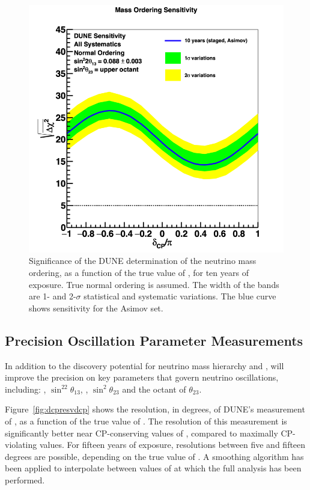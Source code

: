 \begin{figure}[h!]
    \centering
		\includegraphics[width=0.95\linewidth]{graphics/mh_10yr_throws_nh_brazil_2019_v4.png}
	\caption[Significance of the DUNE determination of the neutrino mass ordering: statistical and systematic variations]{Significance of the DUNE determination of the neutrino mass ordering, as a function of the true value of \deltacp, for ten years of exposure. True normal ordering is assumed. The width of the bands are 1- and 2-$\sigma$ statistical and systematic variations. The blue curve shows sensitivity for the Asimov set.}
    \label{fig:mh_stats}
\end{figure}

\subsection{Precision Oscillation Parameter Measurements}
\label{sec:physics-lbnosc-prec}

In addition to the discovery potential for neutrino mass hierarchy and , 
 will improve the precision on key parameters that govern neutrino oscillations, including: \deltacp, $\sin^22\theta_{13}$, , $\sin^2\theta_{23}$ and the octant of $\theta_{23}$. 

Figure~\ref{fig:dcpresvdcp} shows the resolution, in degrees, of DUNE's measurement of \deltacp, as a function of the true value of \deltacp. The resolution of this measurement is significantly better near CP-conserving values of \deltacp, compared to maximally CP-violating values. For fifteen years of exposure, resolutions between five and fifteen degrees are possible, depending on the true value of \deltacp. A smoothing algorithm has been applied to interpolate between values of \deltacp at which the full analysis has been performed.

